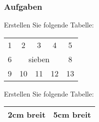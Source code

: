 \begin{frame}
	\frametitle{Aufgaben}
	\begin{block}{Erstellen Sie folgende Tabelle:}
	\begin{center}
	\begin{tabular}{||ccccc||}\hline
	1 & 2 & 3 & 4 & 5 \\ \cline{2-4}
	6 & \multicolumn{3}{|c|}{sieben} & 8 \\ \cline{2-4}
	9 & 10 & 11 & 12 & 13 \\ \hline
	\end{tabular}
	\end{center}
	\end{block}
	
	\begin{block}{Erstellen Sie folgende Tabelle:}
	\begin{center}
	\begin{tabular}{|p{2cm}|p{5cm}|}\hline
	2cm breit & 5cm breit \\ \hline
	\end{tabular}
	\end{center}
	\end{block}
\end{frame}
